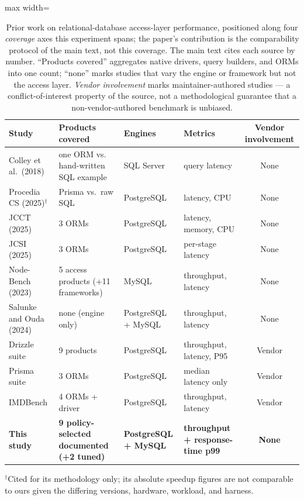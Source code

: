 \documentclass[11pt,a4paper]{article}
\begin{document}
\begin{table}[htbp]
  \centering
  \small
  \caption{Prior work on relational-database access-layer performance,
    positioned along four \emph{coverage} axes this experiment spans; the paper's contribution
    is the comparability protocol of the main text, not this coverage. The main text cites each source by number.
    ``Products covered'' aggregates native drivers, query builders, and ORMs
    into one count; ``none'' marks studies that vary the engine or
    framework but not the access layer. \emph{Vendor involvement} marks maintainer-authored
    studies --- a conflict-of-interest property of the source, not a methodological guarantee that
    a non-vendor-authored benchmark is unbiased.}
  \label{tab:prior_art}
  \begin{adjustbox}{max width=\textwidth}
  \begin{tabular}{@{}llllc@{}}
    \toprule
    Study & Products covered & Engines & Metrics & Vendor involvement \\
    \midrule
    Colley et al.\ (2018) & one ORM vs. hand-written SQL example & SQL Server & query latency & None \\
    Procedia CS (2025)$^\dagger$ & Prisma vs.\ raw SQL & PostgreSQL & latency, CPU & None \\
    JCCT (2025) & 3 ORMs & PostgreSQL & latency, memory, CPU & None \\
    JCSI (2025) & 3 ORMs & PostgreSQL & per-stage latency & None \\
    Node-Bench (2023) & 5 access products (+11 frameworks) & MySQL & throughput, latency & None \\
    Salunke and Ouda (2024) & none (engine only) & PostgreSQL + MySQL & throughput, latency & None \\
    Drizzle suite & 9 products & PostgreSQL & throughput, latency, P95 & Vendor \\
    Prisma suite & 3 ORMs & PostgreSQL & median latency only & Vendor \\
    IMDBench & 4 ORMs + driver & PostgreSQL & throughput, latency & Vendor \\
    \midrule
    \textbf{This study} & \textbf{9 policy-selected documented (+2 tuned)} & \textbf{PostgreSQL + MySQL} & \textbf{throughput + response-time p99} & \textbf{None} \\
    \bottomrule
  \end{tabular}
  \end{adjustbox}
  \vspace{4pt}
  {\raggedright\footnotesize $^\dagger$Cited for its methodology only; its absolute speedup figures are not comparable to ours given the differing versions, hardware, workload, and harness.\par}
\end{table}
\end{document}
